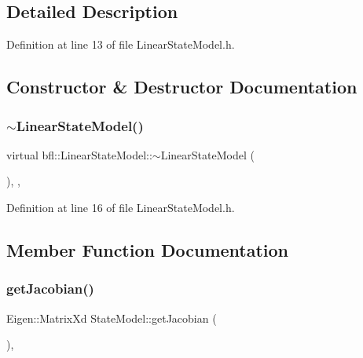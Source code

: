 \subsection{Detailed Description}


Definition at line 13 of file Linear\+State\+Model.\+h.



\subsection{Constructor \& Destructor Documentation}
\mbox{\label{classbfl_1_1LinearStateModel_abe9426efcecc6b1c606f17e0e5101ee0}} 
\subsubsection{\texorpdfstring{$\sim$\+Linear\+State\+Model()}{~LinearStateModel()}}
{\footnotesize\ttfamily virtual bfl\+::\+Linear\+State\+Model\+::$\sim$\+Linear\+State\+Model (\begin{DoxyParamCaption}{ }\end{DoxyParamCaption})\hspace{0.3cm}{\ttfamily [inline]}, {\ttfamily [virtual]}, {\ttfamily [noexcept]}}



Definition at line 16 of file Linear\+State\+Model.\+h.



\subsection{Member Function Documentation}
\mbox{\label{classbfl_1_1StateModel_a78df4b39578345142fcfb18abaab2177}} 
\subsubsection{\texorpdfstring{get\+Jacobian()}{getJacobian()}}
{\footnotesize\ttfamily Eigen\+::\+Matrix\+Xd State\+Model\+::get\+Jacobian (\begin{DoxyParamCaption}{ }\end{DoxyParamCaption})\hspace{0.3cm}{\ttfamily [virtual]}, {\ttfamily [inherited]}}



